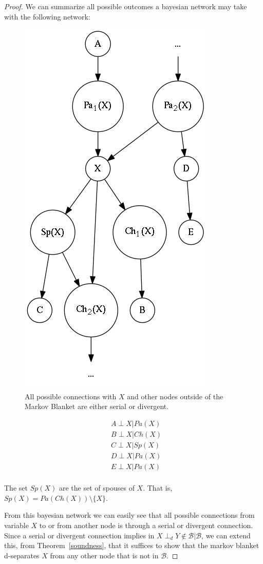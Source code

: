\documentclass{amsart}
\theoremstyle{plain}
\begin{document}
\begin{proof}
  We can summarize all possible outcomes a bayesian network may take with the following network:

  \begin{figure}[h]
    \captionsetup{justification=centering}
    \centering\includegraphics[scale=0.3]{graphs/markov_blanket.png}
    \caption{All possible connections with $X$ and other nodes outside of the Markov Blanket are
    either serial or divergent.}
  \end{figure}

  \begin{align*}
    &A\perp X|Pa(X)\\
    &B\perp X|Ch(X)\\
    &C\perp X|Sp(X)\\
    &D\perp X|Pa(X)\\
    &E\perp X|Pa(X)\\
  \end{align*}

  The set $Sp(X)$ are the set of spouses of $X$. That is, $Sp(X)=Pa(Ch(X))\setminus\{X\}$.

  From this bayesian network we can easily see that all possible connections from variable $X$ to
  or from another node is through a serial or divergent connection. Since a serial or divergent
  connection implies in $X\perp_d Y\not\in\mathcal{B}|\mathcal{B}$, we can extend this, from
  Theorem~\ref{soundness}, that it suffices to show that the markov blanket d-separates $X$ from
  any other node that is not in $\mathcal{B}$.
\end{proof}
\end{document}
